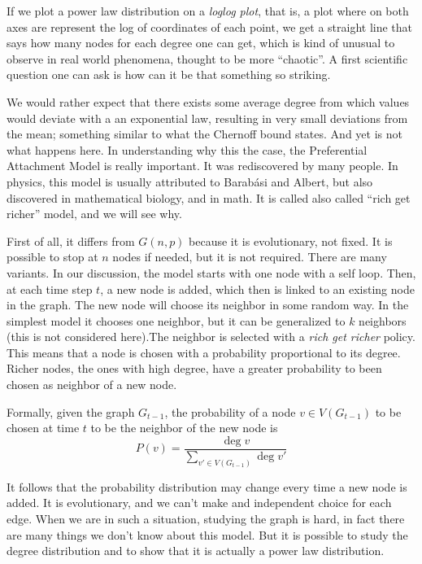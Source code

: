 If we plot a power law distribution on a \emph{loglog plot}, that is, a plot where on both axes are represent the log of coordinates of each point, we get a straight line that says how many nodes for each degree one can get, which is kind of unusual to observe in real world phenomena, thought to be more ``chaotic''. A first scientific question one can ask is how can it be that something so striking.

We would rather expect that there exists some average degree from which values would deviate with a an exponential law, resulting in very small deviations from the mean; something similar to what the Chernoff bound states. And yet is not what happens here. In understanding why this the case, the Preferential Attachment Model is really important. It was rediscovered by many people. In physics, this model is usually attributed to Barabási and Albert, but also discovered in mathematical biology, and in math. It is called also called ``rich get richer'' model, and we will see why.

First of all, it differs from $G(n,p)$ because it is evolutionary, not fixed. It is possible to stop at $n$ nodes if needed, but it is not required. There are many variants. In our discussion, the model starts with one node with a self loop. Then, at each time step $t$, a new node is added, which then is linked to an existing node in the graph. The new node will choose its neighbor in some random way. In the simplest model it chooses one neighbor, but it can be generalized to $k$ neighbors (this is not considered here).The neighbor is selected with a \emph{rich get richer} policy. This means that a node is chosen with a probability proportional to its degree. Richer nodes, the ones with high degree, have a greater probability to been chosen as neighbor of a new node.

Formally, given the graph $G_{t-1}$, the probability of a node $v \in V(G_{t-1})$ to be chosen at time $t$ to be the neighbor of the new node is
\begin{equation}
P(v) = \frac{\deg{v}}{\sum_{v' \in V(G_{t-1})} \deg{v'}}
\end{equation}

It follows that the probability distribution may change every time a new node is added. It is evolutionary, and we can't make and independent choice for each edge. When we are in such a situation, studying the graph is hard, in fact there are many things we don't know about this model. But it is possible to study the degree distribution and to show  that it is actually a power law distribution.

